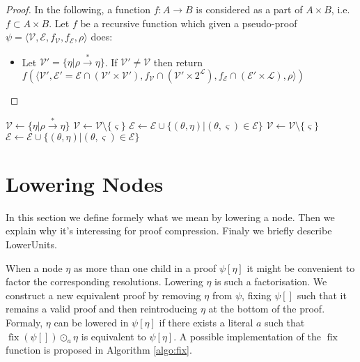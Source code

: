 \documentclass{llncs}
\newcommand{\fix}{\ensuremath{\operatorname{fix}}}
\newenvironment{jogo}{\color{teal}}{}
\begin{document}
\begin{proof}
In the following, a function $f : A \longrightarrow B$ is considered as a part of $A \times B$, i.e.
$f \subset A \times B$.
Let $f$ be a recursive function which given a pseudo-proof $\psi = \langle \mathcal{V},
\mathcal{E}, f_\mathcal{V}, f_\mathcal{E}, \rho \rangle$ does:
\begin{itemize}[nosep]
  \item Let $\mathcal{V}' = \{\eta|\rho \xrightarrow{*} \eta\}$. If $\mathcal{V}' \neq \mathcal{V}$
    then return $f\left(\langle \mathcal{V}', \mathcal{E}' = \mathcal{E} \cap (\mathcal{V}' \times \mathcal{V}'),
    f_\mathcal{V} \cap (\mathcal{V}' \times 2^\mathcal{L}), f_\mathcal{E} \cap (\mathcal{E}' \times \mathcal{L}),
    \rho \rangle\right)$
\end{itemize}
\end{proof}

\begin{algorithm}[hbt]
    { $\mathcal{V} \leftarrow \{\eta|\rho \xrightarrow{*} \eta\}$ \;
    }
  \uElseIf{$\exists \varsigma, \exists ! \eta, \varsigma \rightarrow \eta$}
    { $\mathcal{V} \leftarrow \mathcal{V} \setminus \{\varsigma\}$ \;
      $\mathcal{E} \leftarrow \mathcal{E} \cup \{(\theta,\eta)|(\theta,\varsigma) \in \mathcal{E}\}$ \;
    }
    { $\mathcal{V} \leftarrow \mathcal{V} \setminus \{\varsigma\}$ \;
      $\mathcal{E} \leftarrow \mathcal{E} \cup \{(\theta,\eta)|(\theta,\varsigma) \in \mathcal{E}\}$ \;
    }
\end{algorithm}

\section{Lowering Nodes}

\begin{jogo}
In this section we define formely what we mean by lowering a node. Then we explain why it's
interessing for proof compression. Finaly we briefly describe LowerUnits.
\end{jogo}

When a node $\eta$ as more than one child in a proof $\psi[\eta]$ it might be convenient to factor
the corresponding resolutions. Lowering $\eta$ is such a factorisation. We construct a new
equivalent proof by removing $\eta$ from $\psi$, fixing $\psi[]$ such that it remains a valid proof
and then reintroducing $\eta$ at the bottom of the proof. Formaly, $\eta$ can be lowered in
$\psi[\eta]$ if there exists a literal $a$ such that $\fix\left(\psi[]\right) \odot_a
\eta$ is equivalent to $\psi[\eta]$. A possible implementation of the $\fix$ function
is proposed in Algorithm \ref{algo:fix}.
\end{document}
